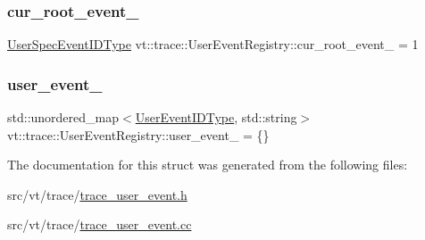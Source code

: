 \mbox{\label{structvt_1_1trace_1_1_user_event_registry_adbebc33d6c64eaee5f6c59be8482b833}} 
\subsubsection{\texorpdfstring{cur\+\_\+root\+\_\+event\+\_\+}{cur\_root\_event\_}}
{\footnotesize\ttfamily \hyperlink{namespacevt_1_1trace_a70c43e0e1596eea236912d4197d3120a}{User\+Spec\+Event\+I\+D\+Type} vt\+::trace\+::\+User\+Event\+Registry\+::cur\+\_\+root\+\_\+event\+\_\+ = 1\hspace{0.3cm}{\ttfamily [private]}}

\mbox{\label{structvt_1_1trace_1_1_user_event_registry_a5756ec4a07f4624f2da1538afe1e553d}} 
\subsubsection{\texorpdfstring{user\+\_\+event\+\_\+}{user\_event\_}}
{\footnotesize\ttfamily std\+::unordered\+\_\+map$<$\hyperlink{namespacevt_1_1trace_a5908920d051c144c89f17c69ed262350}{User\+Event\+I\+D\+Type}, std\+::string$>$ vt\+::trace\+::\+User\+Event\+Registry\+::user\+\_\+event\+\_\+ = \{\}\hspace{0.3cm}{\ttfamily [private]}}



The documentation for this struct was generated from the following files\+:\begin{DoxyCompactItemize}
\item 
src/vt/trace/\hyperlink{trace__user__event_8h}{trace\+\_\+user\+\_\+event.\+h}\item 
src/vt/trace/\hyperlink{trace__user__event_8cc}{trace\+\_\+user\+\_\+event.\+cc}\end{DoxyCompactItemize}
